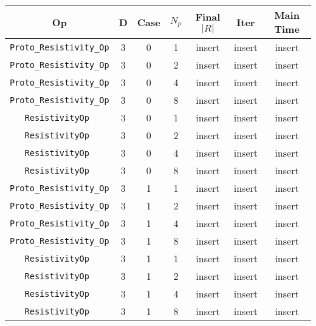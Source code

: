 \documentclass{article}
\begin{document}
\begin{small}
\begin{table}
\begin{center}
\begin{tabular}{|c|c|c|c|c|c||c|} \hline
 Op & D & Case & $N_p$ & Final $|R|$  &  Iter & Main Time    \\
\hline
 {\tt Proto\_Resistivity\_Op} & 3 & 0 &   1    &  insert  &  insert    & insert   \\
 {\tt Proto\_Resistivity\_Op} & 3 & 0 &   2    &  insert  &  insert    & insert   \\
 {\tt Proto\_Resistivity\_Op} & 3 & 0 &   4    &  insert  &  insert    & insert   \\
 {\tt Proto\_Resistivity\_Op} & 3 & 0 &   8    &  insert  &  insert    & insert   \\
\hline                                                                               
 {\tt ResistivityOp }         & 3 & 0   & 1    &  insert  &  insert    & insert    \\
 {\tt ResistivityOp }         & 3 & 0   & 2    &  insert  &  insert    & insert    \\
 {\tt ResistivityOp }         & 3 & 0   & 4    &  insert  &  insert    & insert    \\
 {\tt ResistivityOp }         & 3 & 0   & 8    &  insert  &  insert    & insert    \\
\hline                                                                               
 {\tt Proto\_Resistivity\_Op} & 3 & 1   & 1    &  insert  &  insert    & insert   \\
 {\tt Proto\_Resistivity\_Op} & 3 & 1   & 2    &  insert  &  insert    & insert   \\
 {\tt Proto\_Resistivity\_Op} & 3 & 1   & 4    &  insert  &  insert    & insert   \\
 {\tt Proto\_Resistivity\_Op} & 3 & 1   & 8    &  insert  &  insert    & insert   \\
\hline                                                                               
 {\tt ResistivityOp }         & 3 & 1   & 1    &  insert  &  insert    & insert    \\
 {\tt ResistivityOp }         & 3 & 1   & 2    &  insert  &  insert    & insert    \\
 {\tt ResistivityOp }         & 3 & 1   & 4    &  insert  &  insert    & insert    \\
 {\tt ResistivityOp }         & 3 & 1   & 8    &  insert  &  insert    & insert    \\

\end{tabular}
\end{center}
\end{table}
\end{small}
\end{document}
